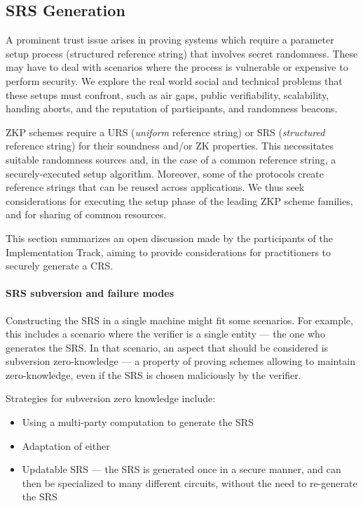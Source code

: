 \subsection{SRS Generation}
\label{implem:correctness:SRS-gen}

A prominent trust issue arises in proving systems which require a parameter setup process (structured reference string) that involves secret randomness. 
These may have to deal with scenarios where the process is vulnerable or expensive to perform security. 
We explore the real world social and technical problems that these setups must confront, such as air gaps, public verifiability, scalability, handing aborts, and the reputation of participants, and randomness beacons.

ZKP schemes require a URS (\emph{uniform} reference string) or SRS (\emph{structured} reference string) for their soundness and/or ZK properties. 
This necessitates suitable randomness sources and, in the case of a common reference string, a securely-executed setup algorithm. 
Moreover, some of the protocols create reference strings that can be reused across applications. 
We thus seek considerations for executing the setup phase of the leading ZKP scheme families, and for sharing of common resources.


This section summarizes an open discussion made by the participants of the Implementation Track, aiming to provide considerations for practitioners to securely generate a CRS.


\paragraph{SRS subversion and failure modes}
Constructing the SRS in a single machine might fit some scenarios. 
For example, this includes a scenario where the verifier is a single entity --- the one who generates the SRS. 
In that scenario, an aspect that should be considered is subversion zero-knowledge --- a property of proving schemes allowing to maintain zero-knowledge, even if the SRS is chosen maliciously by the verifier.

Strategies for subversion zero knowledge include:
\begin{itemize}
    \item Using a multi-party computation to generate the SRS
    \item Adaptation of either \cite{2016:Eurocrypt:On-the-Size-of-Pairing-Based-Non-interactive-Arguments,2013:PHGR:SP:Pinocchio}
    \item Updatable SRS --- the SRS is generated once in a secure manner, and can then be specialized to many different circuits, without the need to re-generate the SRS
\end{itemize}

